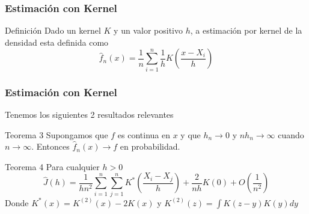 \documentclass[aspectratio=169,spanish]{beamer}
\begin{document}
\begin{frame}
\frametitle{Estimación con Kernel}
\begin{block}{Definición}
Dado un kernel $K$ y un valor positivo $h$, a estimación por kernel de la densidad esta definida como $$\hat{f}_n(x)=\frac{1}{n}\sum_{i=1}^{n}\frac{1}{h}K\left(\frac{x-X_i}{h}\right)$$
\end{block}
\end{frame}
\begin{frame}
\frametitle{Estimación con Kernel}
Tenemos los siguientes 2 resultados relevantes 
\begin{block}{Teorema 3}
Supongamos que $f$ es continua en $x$ y que $h_n\rightarrow0$ y $nh_n\rightarrow \infty$ cuando $n\rightarrow \infty$. Entonces $\hat{f}_n(x)\rightarrow f$ en probabilidad.
\end{block}
\begin{block}{Teorema 4}
Para cualquier $h>0$ 
$$\hat{J}(h)=\frac{1}{hn^2}\sum_{i=1}^{n}\sum_{j=1}^{n}K^{*}\left(\frac{X_i-X_j}{h}\right)+\frac{2}{nh}K(0)+O\left(\frac{1}{n^2}\right)$$
Donde $K^{*}(x)=K^{(2)}(x)-2K(x)$ y $K^{(2)}(z)=\int K(z-y)K(y)dy$
\end{block}
\end{frame}
\end{document}
